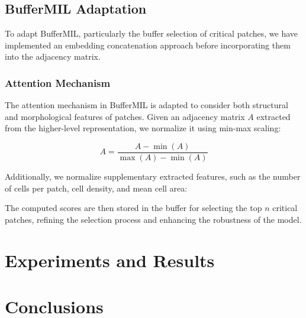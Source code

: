\documentclass[10pt,twocolumn]{article}
\begin{document}


\subsection{BufferMIL Adaptation}

To adapt BufferMIL, particularly the buffer selection of critical patches, we have implemented an embedding concatenation approach before incorporating them into the adjacency matrix. 

\subsubsection{Attention Mechanism}

The attention mechanism in BufferMIL is adapted to consider both structural and morphological features of patches. Given an adjacency matrix $A$ extracted from the higher-level representation, we normalize it using min-max scaling:

\begin{equation}
A = \frac{A - \min(A)}{\max(A) - \min(A)}
\end{equation}

Additionally, we normalize supplementary extracted features, such as the number of cells per patch, cell density, and mean cell area:


The computed scores are then stored in the buffer for selecting the top $n$ critical patches, refining the selection process and enhancing the robustness of the model.

\section{Experiments and Results} \label{results}

\section{Conclusions} \label{conclusions}



\end{document}
